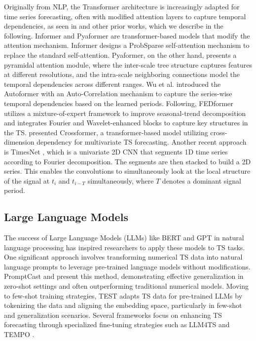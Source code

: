 Originally from NLP, the Transformer architecture is increasingly adapted for time series forecasting, often with modified attention layers to capture temporal dependencies, as seen in  and other prior works, which we describe in the following.
Informer \cite{zhou2021informer} and Pyaformer \cite{liu2022pyraformer} are transformer-based models that modify the attention mechanism. 
Informer designs a ProbSparse self-attention mechanism to replace the standard self-attention. 
Pyaformer, on the other hand, presents a pyramidal attention module, where the inter-scale tree structure captures features at different resolutions, and the intra-scale neighboring connections model the temporal dependencies across different ranges.
Wu et al. \cite{wu2021autoformer} introduced the Autoformer with an Auto-Correlation mechanism to capture the series-wise temporal dependencies based on the learned periods.
Following, FEDformer \cite{zhou2022fedformer} utilizes a mixture-of-expert framework to improve seasonal-trend decomposition and integrates Fourier and Wavelet-enhanced blocks to capture key structures in the TS.
\cite{zhang2023crossformer} presented Crossformer, a transformer-based model utilizing cross-dimension dependency for multivariate TS forecasting.
Another recent approach is TimesNet \cite{wu_timesnet_2023}, which is a univariate 2D CNN that segments 1D time series according to Fourier decomposition. 
The segments are then stacked to build a 2D series. 
This enables the convolutions to simultaneously look at the local structure of the signal at $t_i$ and $t_{i-T}$ simultaneously, where $T$ denotes a dominant signal period.  


\subsection{Large Language Models}

The success of Large Language Models (LLMs) like BERT and GPT in natural language processing has inspired researchers to apply these models to TS tasks.
One significant approach involves transforming numerical TS data into natural language prompts to leverage pre-trained language models without modifications. 
PromptCast \cite{xue2023promptcast} and \cite{gruver2024large} present this method, demonstrating effective generalization in zero-shot settings and often outperforming traditional numerical models. 
Moving to few-shot training strategies, TEST \cite{sun2023test} adapts TS data for pre-trained LLMs by tokenizing the data and aligning the embedding space, particularly in few-shot and generalization scenarios.
Several frameworks focus on enhancing TS forecasting through specialized fine-tuning strategies such as LLM4TS \cite{chang2023llm4ts} and TEMPO \cite{cao2023tempo}.


